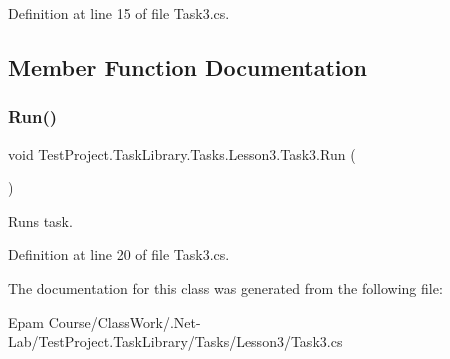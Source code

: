 Definition at line 15 of file Task3.\+cs.



\subsection{Member Function Documentation}
\mbox{\label{class_test_project_1_1_task_library_1_1_tasks_1_1_lesson3_1_1_task3_a5248179445bdea7c7b3e6d8d03e96d2c}} 
\subsubsection{\texorpdfstring{Run()}{Run()}}
{\footnotesize\ttfamily void Test\+Project.\+Task\+Library.\+Tasks.\+Lesson3.\+Task3.\+Run (\begin{DoxyParamCaption}{ }\end{DoxyParamCaption})}



Runs task. 



Definition at line 20 of file Task3.\+cs.



The documentation for this class was generated from the following file\+:\begin{DoxyCompactItemize}
\item 
Epam Course/\+Class\+Work/.\+Net-\/\+Lab/\+Test\+Project.\+Task\+Library/\+Tasks/\+Lesson3/Task3.\+cs\end{DoxyCompactItemize}
